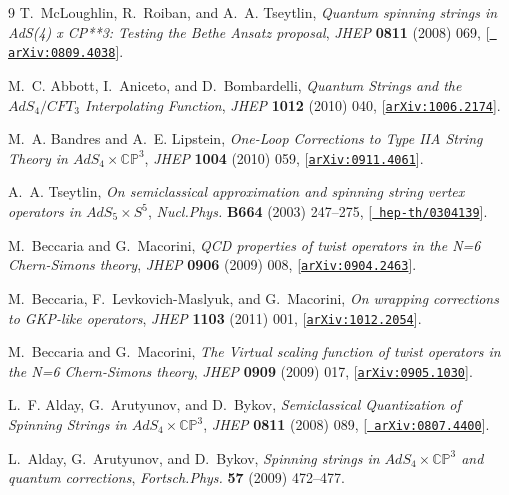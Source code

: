 \documentclass[a4paper,11pt]{article}
\numberwithin{equation}{section}
\begin{document}
\begin{thebibliography} {9}
T.~McLoughlin, R.~Roiban, and A.~A. Tseytlin, {\it {Quantum spinning strings in
  AdS(4) x CP**3: Testing the Bethe Ansatz proposal}},  {\em JHEP} {\bf 0811}
  (2008) 069, [\href{http://xxx.lanl.gov/abs/0809.4038}{{\tt
  arXiv:0809.4038}}].

M.~C. Abbott, I.~Aniceto, and D.~Bombardelli, {\it {Quantum Strings and the
  $AdS_4/CFT_3$ Interpolating Function}},  {\em JHEP} {\bf 1012} (2010) 040,
  [\href{http://xxx.lanl.gov/abs/1006.2174}{{\tt arXiv:1006.2174}}].

M.~A. Bandres and A.~E. Lipstein, {\it {One-Loop Corrections to Type IIA String
  Theory in $AdS_{4}\times\mathbb{CP}^{3}$}},  {\em JHEP} {\bf 1004} (2010)
  059, [\href{http://xxx.lanl.gov/abs/0911.4061}{{\tt arXiv:0911.4061}}].

A.~A. Tseytlin, {\it {On semiclassical approximation and spinning string vertex
  operators in $AdS_{5}\times S^{5}$}},  {\em Nucl.Phys.} {\bf B664} (2003)
  247--275, [\href{http://xxx.lanl.gov/abs/hep-th/0304139}{{\tt
  hep-th/0304139}}].

M.~Beccaria and G.~Macorini, {\it {QCD properties of twist operators in the N=6
  Chern-Simons theory}},  {\em JHEP} {\bf 0906} (2009) 008,
  [\href{http://xxx.lanl.gov/abs/0904.2463}{{\tt arXiv:0904.2463}}].

M.~Beccaria, F.~Levkovich-Maslyuk, and G.~Macorini, {\it {On wrapping
  corrections to GKP-like operators}},  {\em JHEP} {\bf 1103} (2011) 001,
  [\href{http://xxx.lanl.gov/abs/1012.2054}{{\tt arXiv:1012.2054}}].

M.~Beccaria and G.~Macorini, {\it {The Virtual scaling function of twist
  operators in the N=6 Chern-Simons theory}},  {\em JHEP} {\bf 0909} (2009)
  017, [\href{http://xxx.lanl.gov/abs/0905.1030}{{\tt arXiv:0905.1030}}].

L.~F. Alday, G.~Arutyunov, and D.~Bykov, {\it {Semiclassical Quantization of
  Spinning Strings in $AdS_{4}\times \mathbb{CP}^{3}$}},  {\em JHEP} {\bf 0811}
  (2008) 089, [\href{http://xxx.lanl.gov/abs/0807.4400}{{\tt
  arXiv:0807.4400}}].

L.~Alday, G.~Arutyunov, and D.~Bykov, {\it {Spinning strings in $AdS_{4}\times
  \mathbb{CP}^{3}$ and quantum corrections}},  {\em Fortsch.Phys.} {\bf 57}
  (2009) 472--477.

  
\end{thebibliography}
  
\end{document}
